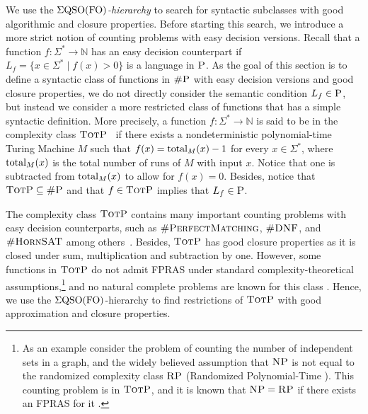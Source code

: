 
We use the \emph{$\Sigma{\rm QSO}({\rm FO})$-hierarchy} to search for syntactic subclasses with good algorithmic and closure properties.  
Before starting this search, we introduce a more strict notion of counting problems with easy decision versions.
Recall that a function $f : \Sigma^* \to \mathbb{N}$ has an easy decision counterpart if $L_f = \{ x \in \Sigma^* \mid f(x) > 0 \}$ is a language in $\text{\sc P}$. As the goal of this section is to define a syntactic class of functions in $\text{\sc \#P}$ with easy decision versions and good closure properties, we do not directly consider the semantic condition $L_f  \in \text{\sc P}$, but instead we consider a more restricted class of functions that has a simple syntactic definition. More precisely, a function $f : \Sigma^* \to \mathbb{N}$ is said to be in the complexity class $\text{\sc TotP}$~\cite{PagourtzisZ06} if there exists a nondeterministic polynomial-time Turing Machine $M$ such that $f(x) = \text{\rm total}_M(x) - 1$ for every $x \in \Sigma^*$, where $\text{\rm total}_M(x)$ is the total number of runs of $M$ with input $x$. Notice that one is subtracted from $\text{\rm total}_M(x)$ to allow for $f(x) = 0$. Besides, notice that $\text{\sc TotP} \subseteq \text{\sc \#P}$ and that $f \in \text{\sc TotP}$ implies that $L_f \in \text{\sc P}$. 

The complexity class $\text{\sc TotP}$ contains many important counting problems with easy decision counterparts, such as $\textsc{\#PerfectMatching}$, $\textsc{\#DNF}$, and $\textsc{\#HornSAT}$ among others~\cite{PagourtzisZ06}. Besides, $\text{\sc TotP}$ has good closure properties as it is closed under sum, multiplication and subtraction by one. However, some functions in $\text{\sc TotP}$ do not admit FPRAS under standard complexity-theoretical assumptions,\footnote{As an example consider the problem of counting the number of independent sets in a graph, and the widely believed assumption that $\text{\sc NP}$ is not equal to the randomized complexity class $\text{\sc RP}$ (Randomized Polynomial-Time \cite{G77}). This counting problem is in $\text{\sc TotP}$, and it is known that $\text{\sc NP} = \text{\sc RP}$ if there exists an FPRAS for it \cite{DFJ02}.} and no natural complete problems are known for this class \cite{PagourtzisZ06}. Hence, we use the $\Sigma{\rm QSO}({\rm FO})$-hierarchy to find restrictions of $\text{\sc TotP}$ with good approximation and closure properties.


